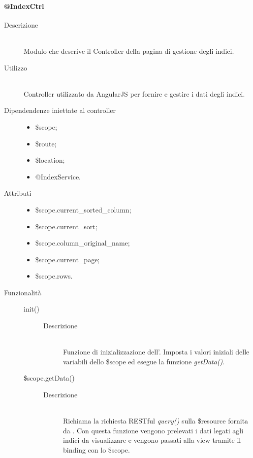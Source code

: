 \paragraph{@IndexCtrl}
\begin{description}
 \item[Descrizione] \hfill \\
 Modulo che descrive il Controller della pagina di gestione degli indici.
 
 \item[Utilizzo] \hfill \\
 Controller utilizzato da AngularJS per fornire e gestire i dati degli indici.

 
 \item[Dipendendenze iniettate al controller] \hfill
 \begin{itemize}
  \item \$scope;
  \item \$route;
  \item \$location;
  \item @IndexService.
 \end{itemize}
 
 \item[Attributi] \hfill
 \begin{itemize}
 	\item \$scope.current\_sorted\_column;
 	\item \$scope.current\_sort;
 	\item \$scope.column\_original\_name;
 	\item \$scope.current\_page;
 	\item \$scope.rows.
 	
 \end{itemize}

 \item[Funzionalità] \hfill 
 \begin{description}
  \item[init()] \hfill 
  	\begin{description}
  		\item[Descrizione] \hfill \\
  		Funzione di inizializzazione dell'. Imposta i valori iniziali delle variabili dello \$scope ed esegue la funzione \textit{getData()}.
  	\end{description}
  
  \item[\$scope.getData()] \hfill 
  \begin{description}
  	\item[Descrizione] \hfill \\
  	Richiama la richiesta RESTful \textit{query()} sulla \$resource fornita da .
  Con questa funzione vengono prelevati i dati legati agli indici da visualizzare e vengono passati alla  view tramite il binding con lo \$scope.
  \end{description}
  

\end{description}
\end{description}
